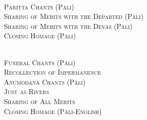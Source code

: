 {  %

  {\libertinusFont\selectfont\textbf{\textsc{}}}\\

  \textsc{
    Paritta Chants (Pāli) \pageref{deva-aradhana}\\
    Sharing of Merits with the Departed (Pāli) \pageref{sharing-merits-departed}\\
    Sharing of Merits with the Devas (Pāli) \pageref{sharing-merits-devas}\\
    Closing Homage (Pāli) \pageref{closing-homage}}\\


  {\libertinusFont\selectfont\textbf{\textsc{}}}\\

  \textsc{
    Funeral Chants (Pāli) \pageref{pubba-bhaga-nama-kara-patho}\\
    Recollection of Impermanence \pageref{recollection-impermanence}\\
    Anumodanā Chants (Pāli) \pageref{yatha-vari-vaha-pura}\\
    Just as Rivers \pageref{just-as-rivers}\\
    Sharing of All Merits \pageref{sharing-all-merits}\\
    Closing Homage (Pāli-English) \pageref{closing-homage}}\\

}

